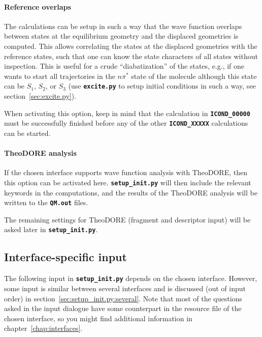\documentclass[a4paper,10pt,DIV=15,openany]{scrbook}
\newcommand{\ttt}[1]{\textbf{\texttt{#1}}}
\begin{document}
\paragraph{Reference overlaps}

The calculations can be setup in such a way that the wave function overlaps between states at the equilibrium geometry and the displaced geometries is computed.
This allows correlating the states at the displaced geometries with the reference states, such that one can know the state characters of all states without inspection.
This is useful for a crude ``diabatization'' of the states, e.g., if one wants to start all trajectories in the $n\pi^*$ state of the molecule although this state can be $S_1$, $S_2$, or $S_3$ (use \ttt{excite.py} to setup initial conditions in such a way, see section~\ref{sec:excite.py}).

When activating this option, keep in mind that the calculation in \ttt{ICOND\_00000} must be successfully finished before any of the other \ttt{ICOND\_XXXXX} calculations can be started.

\paragraph{TheoDORE analysis}

If the chosen interface supports wave function analysis with TheoDORE, then this option can be activated here.
\ttt{setup\_init.py} will then include the relevant keywords in the computations, and the results of the TheoDORE analysis will be written to the \ttt{QM.out} files.

The remaining settings for TheoDORE (fragment and descriptor input) will be asked later in \ttt{setup\_init.py}.

\subsection{Interface-specific input}

The following input in \ttt{setup\_init.py} depends on the chosen interface.
However, some input is similar between several interfaces and is discussed (out of input order) in section~\ref{sec:setup_init.py:several}.
Note that most of the questions asked in the input dialogue have some counterpart in the resource file of the chosen interface, so you might find additional information in chapter~\ref{chap:interfaces}.

\end{document}
